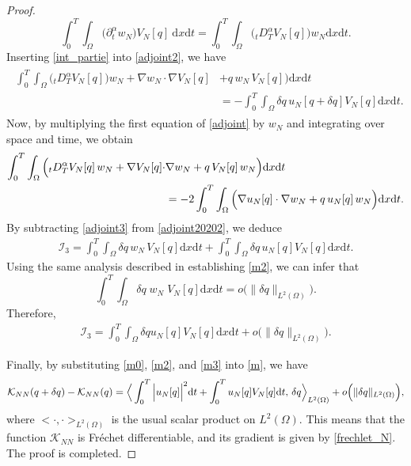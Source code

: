 \documentclass[a4paper,12pt,reqno,natbib]{amsart}
\newcommand{\dx} {\displaystyle\mathrm{d}x}
\newcommand{\dt} {\displaystyle\mathrm{d}t}
\begin{document}
{\begin{proof}
\begin{equation}
    \int_0^T\int_{\Omega} \Big(\partial_t^\alpha  w_N \Big) V_N[q] \ \dx \dt =\int_0^T\int_\Omega \Big( {}_tD^{\alpha}_T V_N[q] \Big) w_N \dx\dt.
\end{equation}
Inserting \eqref{int_partie} into \eqref{adjoint2}, we have
\begin{align}
\begin{split}\label{adjoint20202}
\int_0^T\int_{\Omega}\Big(
{}_tD^{\alpha}_T V_N[q] \Big) w_N +
\nabla w_N\cdot\nabla V_N[q] &+ q\,w_N\,V_N[q] \Big)\dx \dt
\\
&=-\int_0^T\int_{\Omega}
\delta q\, u_N[q+\delta q]V_N[q] \dx \dt.
\end{split}
\end{align}
Now, by multiplying the first equation of \eqref{adjoint} by $w_N$ and integrating over space and time, we obtain
\begin{align} \notag
\int_0^T\int_{\Omega}\Big(
{}_tD^{\alpha}_T V_N[q]\,w_N +
\nabla V_N[q]\cdot&\nabla w_N + q\,V_N[q]\,w_N \Big)\dx \dt\\ &=-2\int_0^T\int_{\Omega}
\Big(\nabla u_N[q]\cdot\nabla w_N +q\,u_N[q]\,w_N\Big) \dx \dt.\label{adjoint3}
\end{align}
By subtracting \eqref{adjoint3} from \eqref{adjoint20202}, we deduce
\begin{align*} 
    \mathcal{I}_3=\int_0^T\int_{\Omega} \delta q \,w_N \,V_N[q] \dx\dt+\int_0^T\int_{\Omega} \delta q\, u_N[q] V_N[q] \dx\dt.
\end{align*}
Using the same analysis described in establishing \eqref{m2}, we can infer that
\begin{equation*}%
    \int_0^T\int_{\Omega} \delta q \;w_N \;V_N[q] \dx\dt=o\Big(\|\delta q\|_{L^2(\Omega)}\Big).
\end{equation*}
Therefore,
\begin{align}
     \mathcal{I}_3= \int_0^T\int_{\Omega} \delta q u_N[q] V_N[q] \dx\dt+o\Big(\|\delta q\|_{L^2(\Omega)}\Big).\label{m3}
\end{align}

Finally, by substituting \eqref{m0}, \eqref{m2}, and \eqref{m3} into \eqref{m}, we have
\begin{align}\notag
    \mathcal{K}_{NN}(q+\delta q) - \mathcal{K}_{NN}(q) = \Big<\int_0^T\Big| u_N[q]\Big|^2 \dt + \int_0^T  u_N[q] V_N[q]\dt,\,\delta q\Big>_{L^2(\Omega)}+o\Big(\|\delta q\|_{L^2(\Omega)}\Big),
\end{align}
where $\Big<\cdot,\cdot\Big>_{L^2(\Omega)}$ is the usual scalar product on $L^2(\Omega).$ This means that the function $\mathcal{K}_{NN}$ is Fr\'echet differentiable, and its gradient is given by \eqref{frechlet_N}. The proof is completed.
\end{proof}

}
\end{document}
